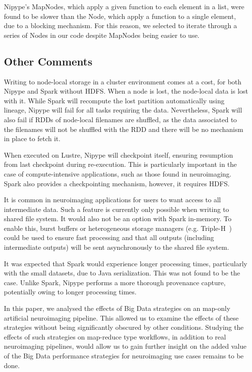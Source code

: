 Nipype's MapNodes, which apply a given function to each element in a list, were
found to be slower than the Node, which apply a function to a single element,
due to a blocking mechanism. For this reason, we selected to iterate through a
series of Nodes in our code despite MapNodes being easier to use.


\subsection{Other Comments}

Writing to node-local storage in a cluster environment comes at a cost, for both
Nipype and Spark without HDFS. When a node is lost, the node-local data is lost
with it. While Spark will recompute the lost partition automatically using
lineage, Nipype will fail for all tasks requiring the data. Nevertheless, Spark
will also fail if RDDs of node-local filenames are shuffled, as the data
associated to the filenames will not be shuffled with the RDD and there will be
no mechanism in place to fetch it.

When executed on Lustre, Nipype will checkpoint itself, ensuring resumption from
last checkpoint during re-execution. This is particularly important in the case
of compute-intensive applications, such as those found in neuroimaging. Spark
also provides a checkpointing mechanism, however, it requires HDFS.

It is common in neuroimaging applications for users to want access to all
intermediate data. Such a feature is currently only possible when writing to
shared file system. It would also not be an option with Spark in-memory. To
enable this, burst buffers or heterogeneous storage managers (e.g.
Triple-H~\cite{islam2015triple}) could be used to ensure fast processing and
that all outputs (including intermediate outputs) will be sent asynchronously to
the shared file system.

It was expected that Spark would experience longer processing times,
particularly with the small datasets, due to Java serialization. This was not
found to be the case. Unlike Spark, Nipype performs a more thorough provenance
capture, potentially owing to longer processing times.

In this paper, we analysed the effects of Big Data strategies on an map-only
artificial neuroimaging pipeline. This allowed us to examine the effects of
these strategies without being significantly obscured by other conditions.
Studying the effects of such strategies on map-reduce type workflows, in
addition to real neuroimaging pipelines, would allow us to gain further insight
on the added value of the Big Data performance strategies for neuroimaging use
cases remains to be done.

